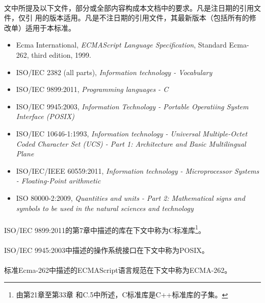 \paragraph{}
文中所提及以下文件，部分或全部内容构成本文档中的要求。凡是注日期的引用文件，仅引
用的版本适用。凡是不注日期的引用文件，其最新版本（包括所有的修改单）适用于本标准。
\begin{itemize}
  \item Ecma International, \textit{ECMAScript Language Specification}, Standard
    Ecma-262, third edition, 1999.
  \item ISO/IEC 2382 (all parts), \textit{Information technology - Vocabulary}
  \item ISO/IEC 9899:2011, \textit{Programming languages - C}
  \item ISO/IEC 9945:2003, \textit{Information Technology - Portable Operatiing
    System Interface (POSIX)}
  \item ISO/IEC 10646-1:1993, \textit{Information technology - Universal
      Multiple-Octet Coded Character Set (UCS) - Part 1: Architecture and Basic
    Multilingual Plane}
  \item ISO/IEC/IEEE 60559:2011, \textit{Information technology - Microprocessor
    Systems - Floating-Point arithmetic}
  \item ISO 80000-2:2009, \textit{Quantities and units - Part 2: Mathematical
    signs and symbols to be used in the natural sciences and technology}
\end{itemize}

\paragraph{}
ISO/IEC 9899:2011的第7章中描述的库在下文中称为C标准库\footnote{由第21章至第33章
和C.5中所述，C标准库是C++标准库的子集。}。

\paragraph{}
ISO/IEC 9945:2003中描述的操作系统接口在下文中称为POSIX。

\paragraph{}
标准Ecma-262中描述的ECMAScript语言规范在下文中称为ECMA-262。

